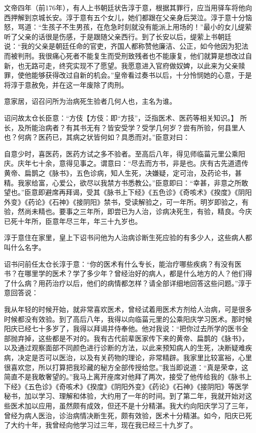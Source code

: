 \documentclass[12pt,UTF8]{ctexbook}
\begin{document}
文帝四年（前176年），有人上书朝廷状告淳于意，根据其罪行，应当用驿车将他向西押解到京城长安。淳于意有五个女儿，她们都跟在父亲身后哭泣。淳于意十分恼怒，骂道：“生孩子不生男孩，在危急时刻就没有能派上用场的！”最小的女儿缇萦听了父亲的话很是伤感，于是跟随父亲西行。到了长安以后，缇萦上书朝廷说：“我的父亲是朝廷任命的官吏，齐国人都称赞他廉洁、公正，如今他因为犯法而被判刑。我很痛心死者不能复生而受刑致残者也不能康复，他们就算是想改过自新，也无路可走，终究实现不了愿望。我愿意进入官府做奴婢，以此来为父亲赎罪，使他能够获得改过自新的机会。”皇帝看过奏书以后，十分怜悯她的心意，于是将淳于意赦免，并在这一年废除了肉刑。

意家居，诏召问所为治病死生验者几何人也，主名为谁。

诏问故太仓长臣意：“方伎【方伎：即“方技”，泛指医术、医药等相关知识。】 所长，及所能治病者？有其书无有？皆安受学？受学几何岁？尝有所验，何县里人也？何病？医药已，其病之状皆何如？具悉而对。”臣意对曰：

自意少时，喜医药，医药方试之多不验者。至高后八年，得见师临菑元里公乘阳庆。庆年七十余，意得见事之。谓意曰：“尽去而方书，非是也。庆有古先道遗传黄帝、扁鹊之《脉书》，五色诊病，知人生死，决嫌疑，定可治，及药论书，甚精。我家给富，心爱公，欲尽以我禁方书悉教公。”臣意即曰：“幸甚，非意之所敢望也。”臣意即避席再拜谒，受其《脉书上下经》《五色诊》《奇咳术》《揆度》《阴阳外变》《药论》《石神》《接阴阳》禁书，受读解验之，可一年所。明岁即验之，有验，然尚未精也。要事之三年所，即尝已为人治，诊病决死生，有验，精良。今庆已死十年所，臣意年尽三年，年三十九岁也。

淳于意住在家里，皇上下诏书问他为人治病诊断生死应验的有多少人，这些病人都叫什么名字。

诏书问前任太仓长淳于意：“你的医术有什么专长，能治疗哪些疾病？有没有医书？在哪里学的医术？学了多少年？曾经治好的病人，都是什么地方的人？他们得了什么病？用药治疗以后，他们的病情都怎样？请全部详细地回答这些问题。”淳于意回答说：

我从年轻的时候开始，就非常喜欢医术，曾经试着用医术方剂给人治病，可是很多时候都没有效验。到了高后八年，我得以向临菑元里的公乘阳庆学习医术。那时候阳庆已经七十多岁了，我得以拜谒并侍奉他。他对我说：“把你过去所学的医书全部抛弃掉，这些都是不对的。我有古代前辈医家传下来的黄帝、扁鹊的《脉书》，以及通过观察面部不同颜色进行诊断的方法，以此来预知病人的生死，决断疑难疾病，决定是否可以医治，以及有关药物的理论，非常精辟。我家里比较富裕，心里很喜欢您，所以打算把我珍藏的秘方全部传授给您。”我当即说道：“真是荣幸，这简直不是我敢奢望的。”我马上离开座席对他拜了两次，接受了他传给我的《脉书上下经》《五色诊》《奇咳术》《揆度》《阴阳外变》《药论》《石神》《接阴阳》等医学秘书，加以学习、理解和体验，大约用了一年的时间。到了第二年，我就开始对这些医术加以应用，虽然颇有成效，但还不是十分精湛。我大约向阳庆学习了三年，曾经为病人医治，诊治病情决断生死，颇有效验，医术十分精湛。如今，阳庆已死了大约十年，我曾经向他学习过三年，现在我已经三十九岁了。
\end{document}
